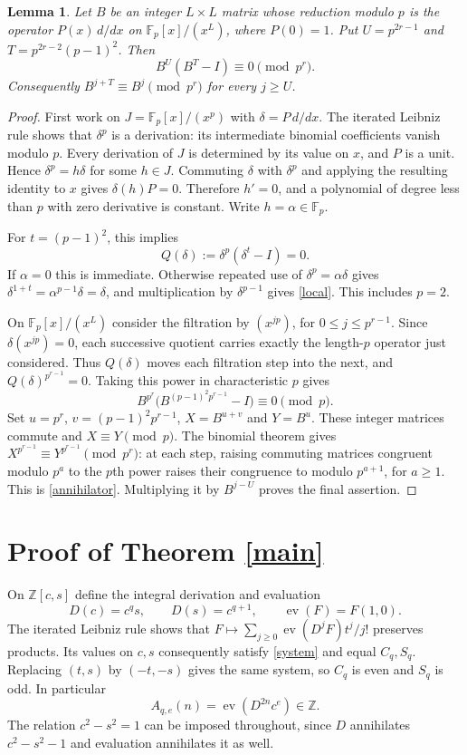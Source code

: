 \documentclass[11pt]{article}
\newtheorem{lemma}{Lemma}
\newcommand{\ZZ}{\mathbb Z}
\newcommand{\FF}{\mathbb F}
\newcommand{\ev}{\operatorname{ev}}
\begin{document}
\begin{lemma}\label{jet}
Let $B$ be an integer $L\times L$ matrix whose reduction modulo $p$ is
the operator $P(x)\,d/dx$ on $\FF_p[x]/(x^L)$, where $P(0)=1$.
Put $U=p^{2r-1}$ and $T=p^{2r-2}(p-1)^2$. Then
\begin{equation}\label{annihilator}
 B^U(B^T-I)\equiv0\pmod{p^r}.
\end{equation}
Consequently $B^{j+T}\equiv B^j\pmod{p^r}$ for every $j\geq U$.
\end{lemma}
\begin{proof}
First work on $J=\FF_p[x]/(x^p)$ with $\delta=P\,d/dx$.
The iterated Leibniz rule shows that $\delta^p$ is a derivation: its
intermediate binomial coefficients vanish modulo $p$. Every derivation
of $J$ is determined by its value on $x$, and $P$ is a unit. Hence
$\delta^p=h\delta$ for some $h\in J$. Commuting $\delta$ with
$\delta^p$ and applying the resulting identity to $x$ gives
$\delta(h)P=0$. Therefore $h'=0$, and a polynomial of degree less
than $p$ with zero derivative is constant. Write $h=\alpha\in\FF_p$.

For $t=(p-1)^2$, this implies
\begin{equation}\label{local}
 Q(\delta):=\delta^p(\delta^t-I)=0.
\end{equation}
If $\alpha=0$ this is immediate. Otherwise repeated use of
$\delta^p=\alpha\delta$ gives
$\delta^{1+t}=\alpha^{p-1}\delta=\delta$, and multiplication by
$\delta^{p-1}$ gives \eqref{local}. This includes $p=2$.

On $\FF_p[x]/(x^L)$ consider the filtration by $(x^{jp})$, for
$0\leq j\leq p^{r-1}$. Since $\delta(x^{jp})=0$, each successive
quotient carries exactly the length-$p$ operator just considered.
Thus $Q(\delta)$ moves each filtration step into the next, and
$Q(\delta)^{p^{r-1}}=0$. Taking this power in characteristic $p$ gives
\[
 B^{p^r}\bigl(B^{(p-1)^2p^{r-1}}-I\bigr)\equiv0\pmod p.
\]
Set $u=p^r$, $v=(p-1)^2p^{r-1}$, $X=B^{u+v}$ and $Y=B^u$.
These integer matrices commute and $X\equiv Y\pmod p$.
The binomial theorem gives
$X^{p^{r-1}}\equiv Y^{p^{r-1}}\pmod{p^r}$: at each step,
raising commuting matrices congruent modulo $p^a$ to the $p$th power
raises their congruence to modulo $p^{a+1}$, for $a\geq1$.
This is \eqref{annihilator}. Multiplying it by $B^{j-U}$ proves
the final assertion.
\end{proof}

\section{Proof of Theorem \ref{main}}
On $\ZZ[c,s]$ define the integral derivation and evaluation
\[
 D(c)=c^qs,\qquad D(s)=c^{q+1},\qquad \ev(F)=F(1,0).
\]
The iterated Leibniz rule shows that
$F\mapsto\sum_{j\geq0}\ev(D^jF)t^j/j!$ preserves products.
Its values on $c,s$ consequently satisfy \eqref{system} and equal
$C_q,S_q$. Replacing $(t,s)$ by $(-t,-s)$ gives the same system,
so $C_q$ is even and $S_q$ is odd. In particular
\begin{equation}\label{integral}
 A_{q,e}(n)=\ev(D^{2n}c^e)\in\ZZ.
\end{equation}
The relation $c^2-s^2=1$ can be imposed throughout, since $D$ annihilates
$c^2-s^2-1$ and evaluation annihilates it as well.
\end{document}
